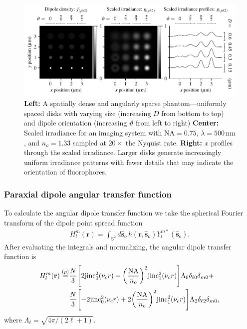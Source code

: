 \documentclass[]{osa-article}
\let\originalleft\left
\let\originalright\right
\renewcommand{\left}{\mathopen{}\mathclose\bgroup\originalleft}
\renewcommand{\right}{\aftergroup\egroup\originalright}
\providecommand{\mb}[1]{\mathbf{#1}}
\providecommand{\so}{\mathbf{\hat{s}}_o}
\providecommand{\mbb}[1]{\mathbb{#1}}
\begin{document}
  \begin{figure}[h]
 \centering
   \centering
   \includegraphics[scale=0.8]{../figures/paratfs/ph2.pdf}
   \caption{\textbf{Left:} A spatially dense and angularly sparse
     phantom---uniformly spaced disks with varying size (increasing $D$ from
     bottom to top) and dipole orientation (increasing $\vartheta$ from left to
     right) \textbf{Center:} Scaled irradiance for an imaging system with
     $\text{NA} = 0.75$, $\lambda = 500\,\text{nm}$, and $n_o = 1.33$ sampled at
     $20\times$ the Nyquist rate. \textbf{Right:} $x$ profiles through the
     scaled irradiance. Larger disks generate increasingly uniform irradiance
     patterns with fewer details that may indicate the orientation of
     fluorophores.}
   \label{fig:ph2}
 \end{figure}

 \subsubsection{Paraxial dipole angular transfer function}
 To calculate the angular dipole transfer function we take the spherical Fourier
 transform of the dipole point spread function
 \begin{align}
H_l^m(\mb{r}) \stackrel{}{=} \int_{\mbb{S}^2}d\so\, h(\mb{r}, \so)Y_l^{m*}(\so).
 \end{align}
 After evaluating the integrals and normalizing, the angular dipole transfer
 function is
 \begin{align}
   H_l^m(\mb{r}) \stackrel{(p)}{=} &\frac{N}{3}\left[2\text{jinc}_0^2(\nu_cr) + \left(\frac{\text{NA}}{n_o}\right)^2\text{jinc}_1^2(\nu_c r)\right]\Lambda_0\delta_{\ell0}\delta_{m0} + \nonumber\\& \frac{N}{3}\left[-2\text{jinc}_0^2(\nu_c r) + 2\left(\frac{\text{NA}}{n_o}\right)^2\text{jinc}_1^2(\nu_c r)\right]\Lambda_2\delta_{\ell2}\delta_{m0},
 \end{align}
where $\Lambda_{\ell} = \sqrt{4\pi/(2\ell + 1)}$. 
\end{document}
